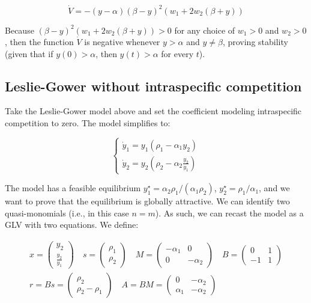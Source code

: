 \documentclass{article}
\begin{document}
\begin{equation}
\dot{V} = -(y - \alpha) (\beta - y)^2 (w_1 + 2 w_2 (\beta + y))
\end{equation}

Because \((\beta - y)^2 (w_1 + 2 w_2 (\beta + y)) > 0\) for any choice
of \(w_1>0\) and \(w_2>0\), then the function \(\dot{V}\) is negative
whenever \(y > \alpha\) and \(y \neq \beta\), proving stability (given
that if \(y(0) > \alpha\), then \(y(t) > \alpha\) for every \(t\)).

\hypertarget{leslie-gower-without-intraspecific-competition}{%
\subsection{Leslie-Gower without intraspecific
competition}\label{leslie-gower-without-intraspecific-competition}}

\label{sec:lgnosr}

Take the Leslie-Gower model above and set the coefficient modeling
intraspecific competition to zero. The model simplifies to:

\begin{equation}
\label{eq:lgnosr}
\begin{cases}
\dot{y}_1 = y_1 (\rho_1 - \alpha_1 y_2)\\
\dot{y}_2 = y_2 \left(\rho_2 - \alpha_2 \frac{y_2}{y_1} \right)
\end{cases}
\end{equation}

The model has a feasible equilibrium
\(y_1^\star = \alpha_2 \rho_1 / (\alpha_1 \rho_2)\),
\(y_2^\star = \rho_1 / \alpha_1\), and we want to prove that the
equilibrium is globally attractive. We can identify two quasi-monomials
(i.e., in this case \(n = m\)). As such, we can recast the model as a
GLV with two equations. We define:

\begin{equation}
\begin{aligned}
x = \begin{pmatrix}
y_2\\
\frac{y_2}{y_1}
\end{pmatrix}
\quad
s = \begin{pmatrix}
\rho_1 \\
\rho_2
\end{pmatrix}
\quad
M = \begin{pmatrix}
-\alpha_1 & 0\\
0 & -\alpha_2
\end{pmatrix}
\quad
B = \begin{pmatrix}
0 & 1\\
-1 & 1
\end{pmatrix}
\\
r = Bs= \begin{pmatrix}
\rho_2\\
\rho_2 - \rho_1
\end{pmatrix}
\quad 
A = BM = \begin{pmatrix}
0 & -\alpha_2\\
\alpha_1 & -\alpha_2
\end{pmatrix}
\end{aligned}
\end{equation}
\end{document}
